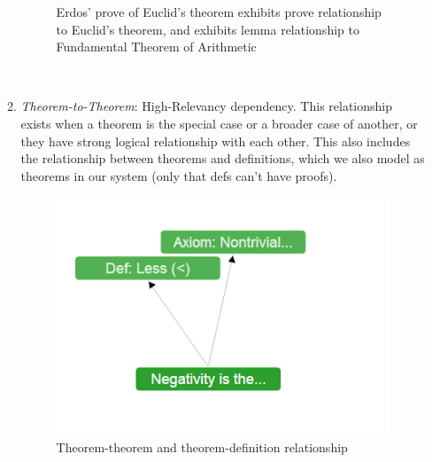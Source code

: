 \documentclass{acm_proc_article-sp}
\begin{document}
\begin{itemize}
\begin{enumerate}
\begin{figure}[h!]
\caption{Erdos' prove of Euclid's theorem exhibits prove relationship to Euclid's theorem, and exhibits lemma relationship to Fundamental Theorem of Arithmetic}
\end{figure}\
\item \emph{Theorem-to-Theorem}: High-Relevancy dependency. This relationship exists when a theorem is the special case or a broader case of another, or they have strong logical relationship with each other. This also includes the relationship between theorems and definitions, which we also model as theorems in our system (only that defs can't have proofs).
\begin{figure}[h!]
\centering
\includegraphics[scale=0.4]{tt_relationship.png}
\caption{Theorem-theorem and theorem-definition relationship}
\end{figure}\
\end{enumerate}


\end{itemize}
\end{document}
